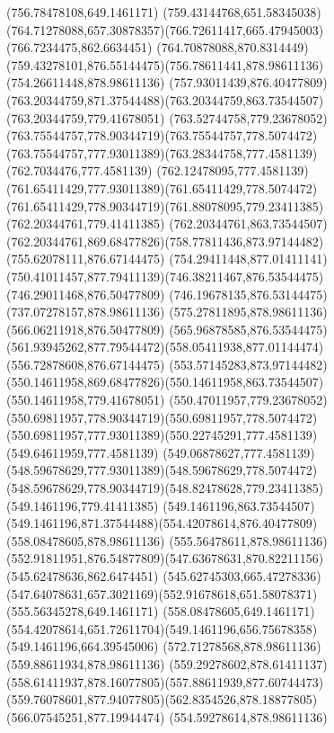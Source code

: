 {{		\lineto(756.78478108,649.1461171)
		\curveto(759.43144768,651.58345038)(764.71278088,657.30878357)(766.72611417,665.47945003)
		\lineto(766.7234475,862.6634451)
		\curveto(764.70878088,870.8314449)(759.43278101,876.55144475)(756.78611441,878.98611136)
		\lineto(754.26611448,878.98611136)
		\curveto(757.93011439,876.40477809)(763.20344759,871.37544488)(763.20344759,863.73544507)
		\lineto(763.20344759,779.41678051)
		\curveto(763.52744758,779.23678052)(763.75544757,778.90344719)(763.75544757,778.5074472)
		\curveto(763.75544757,777.93011389)(763.28344758,777.4581139)(762.7034476,777.4581139)
		\curveto(762.12478095,777.4581139)(761.65411429,777.93011389)(761.65411429,778.5074472)
		\curveto(761.65411429,778.90344719)(761.88078095,779.23411385)(762.20344761,779.41411385)
		\lineto(762.20344761,863.73544507)
		\curveto(762.20344761,869.68477826)(758.77811436,873.97144482)(755.62078111,876.67144475)
		\curveto(754.29411448,877.01411141)(750.41011457,877.79411139)(746.38211467,876.53544475)
		\lineto(746.29011468,876.50477809)
		\lineto(746.19678135,876.53144475)
		\lineto(737.07278157,878.98611136)
		\lineto(575.27811895,878.98611136)
		\lineto(566.06211918,876.50477809)
		\lineto(565.96878585,876.53544475)
		\curveto(561.93945262,877.79544472)(558.05411938,877.01144474)(556.72878608,876.67144475)
		\curveto(553.57145283,873.97144482)(550.14611958,869.68477826)(550.14611958,863.73544507)
		\lineto(550.14611958,779.41678051)
		\curveto(550.47011957,779.23678052)(550.69811957,778.90344719)(550.69811957,778.5074472)
		\curveto(550.69811957,777.93011389)(550.22745291,777.4581139)(549.64611959,777.4581139)
		\curveto(549.06878627,777.4581139)(548.59678629,777.93011389)(548.59678629,778.5074472)
		\curveto(548.59678629,778.90344719)(548.82478628,779.23411385)(549.1461196,779.41411385)
		\lineto(549.1461196,863.73544507)
		\curveto(549.1461196,871.37544488)(554.42078614,876.40477809)(558.08478605,878.98611136)
		\lineto(555.56478611,878.98611136)
		\curveto(552.91811951,876.54877809)(547.63678631,870.82211156)(545.62478636,862.6474451)
		\lineto(545.62745303,665.47278336)
		\curveto(547.64078631,657.3021169)(552.91678618,651.58078371)(555.56345278,649.1461171)
		\lineto(558.08478605,649.1461171)
		\curveto(554.42078614,651.72611704)(549.1461196,656.75678358)(549.1461196,664.39545006)
		\moveto(572.71278568,878.98611136)
		\lineto(559.88611934,878.98611136)
		\curveto(559.29278602,878.61411137)(558.61411937,878.16077805)(557.88611939,877.60744473)
		\curveto(559.76078601,877.94077805)(562.8354526,878.18877805)(566.07545251,877.19944474)
		\closepath
		\moveto(554.59278614,878.98611136)
}}
